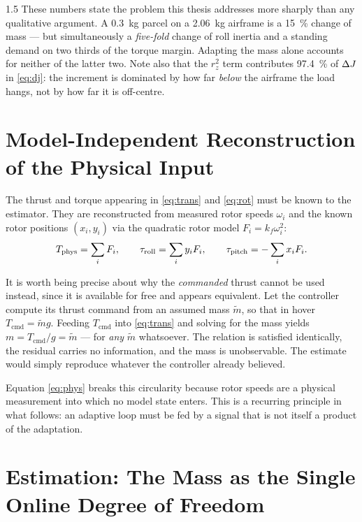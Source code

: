 \begin{spacing}{1.5}
These numbers state the problem this thesis addresses more sharply than
any qualitative argument. A \SI{0.3}{\kg} parcel on a \SI{2.06}{\kg}
airframe is a \SI{15}{\percent} change of mass --- but simultaneously a
\emph{five-fold} change of roll inertia and a standing demand on two
thirds of the torque margin. Adapting the mass alone accounts for neither
of the latter two. Note also that the $r_z^2$ term contributes
\SI{97.4}{\percent} of $\Delta J$ in \eqref{eq:dj}: the increment is dominated
by how far \emph{below} the airframe the load hangs, not by how far it is
off-centre.

\section{Model-Independent Reconstruction of the Physical Input}\label{sec:model:phys}

The thrust and torque appearing in \eqref{eq:trans} and \eqref{eq:rot}
must be known to the estimator. They are reconstructed from measured
rotor speeds $\omega_i$ and the known rotor positions $(x_i, y_i)$ via the
quadratic rotor model $F_i = k_f \omega_i^2$:
\begin{equation}
T_{\mathrm{phys}} = \sum_i F_i, \qquad
\tau_{\mathrm{roll}} = \sum_i y_i F_i, \qquad
\tau_{\mathrm{pitch}} = -\sum_i x_i F_i .
\label{eq:phys}
\end{equation}

It is worth being precise about why the \emph{commanded} thrust cannot be
used instead, since it is available for free and appears equivalent. Let
the controller compute its thrust command from an assumed mass
$\tilde{m}$, so that in hover $T_{\mathrm{cmd}} = \tilde{m} g$. Feeding
$T_{\mathrm{cmd}}$ into \eqref{eq:trans} and solving for the mass yields
$m = T_{\mathrm{cmd}} / g = \tilde{m}$ --- for \emph{any} $\tilde{m}$
whatsoever. The relation is satisfied identically, the residual carries no
information, and the mass is unobservable. The estimate would simply
reproduce whatever the controller already believed.

Equation \eqref{eq:phys} breaks this circularity because rotor speeds are
a physical measurement into which no model state enters. This is a
recurring principle in what follows: an adaptive loop must be fed by a
signal that is not itself a product of the adaptation.

\section{Estimation: The Mass as the Single Online Degree of Freedom}\label{sec:model:mhe}


\end{spacing}
